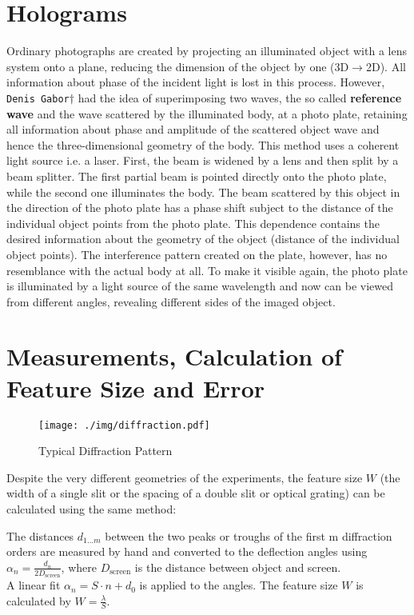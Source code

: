 \section{Holograms}\label{sec:holograms}
Ordinary photographs are created by projecting an illuminated object with a lens system onto a plane, reducing the dimension of the object by one (3D$\rightarrow$2D).
All information about phase of the incident light is lost in this process.
However, \texttt{Denis Gabor}$\dagger$ had the idea of superimposing two waves, the so called \textbf{reference wave} and the wave scattered by the illuminated body, at a photo plate, retaining all information about phase and amplitude of the scattered object wave and hence the three-dimensional geometry of the body.
This method uses a coherent light source i.e. a laser.
First, the beam is widened by a lens and then split by a beam splitter.
The first partial beam is pointed directly onto the photo plate, while the second one illuminates the body.
The beam scattered by this object in the direction of the photo plate has a phase shift subject to the distance of the individual object points from the photo plate.
This dependence contains the desired information about the geometry of the object (distance of the individual object points).
The interference pattern created on the plate, however, has no resemblance with the actual body at all.
To make it visible again, the photo plate is illuminated by a light source of the same wavelength and now can be viewed from different angles, revealing different sides of the imaged object.

\section{Measurements, Calculation of Feature Size and Error}\label{sec:meas}
\begin{figure}[tb]
	\centering
	\texttt{[image: ./img/diffraction.pdf]}
	\caption{Typical Diffraction Pattern}
	\label{fig:diffraction}
\end{figure}
Despite the very different geometries of the experiments, the feature size $W$ (the width of a single slit or the spacing of a double slit or optical grating) can be calculated using the same method:

The distances $d_{1 \dots m}$ between the two peaks or troughs of the first m diffraction orders are measured by hand and converted to the deflection angles using $\alpha_n = \frac{d_n}{2 D_\text{screen}}$, where $D_\text{screen}$ is the distance between object and screen.\\
A linear fit $\alpha_n = S \cdot n + d_0$ is applied to the angles.
The feature size $W$ is calculated by $W = \frac{\lambda}{S}$.

